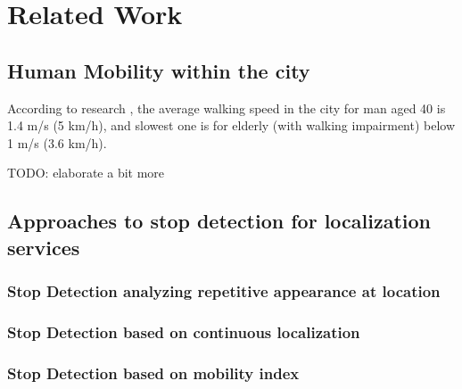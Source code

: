 \chapter{Related Work}
\label{cha:relatedwork}

\section{Human Mobility within the city}
\label{cha:introduction_hummob}

According to research \cite{HumanMobility1}\cite{HumanMobility2}\cite{HumanMobility3}, the average walking speed in the city for man aged 40 is 1.4 m/s (5 km/h), and slowest one is for elderly (with walking impairment) below 1 m/s (3.6 km/h). 

TODO: elaborate a bit more

\section{Approaches to stop detection for localization services}
\label{cha:introduction_appr_stopdet}

\subsection{Stop Detection analyzing repetitive appearance at location}

\subsection{Stop Detection based on continuous localization}

\subsection{Stop Detection based on mobility index}
\label{cha:introduction_mob_index_sect}

